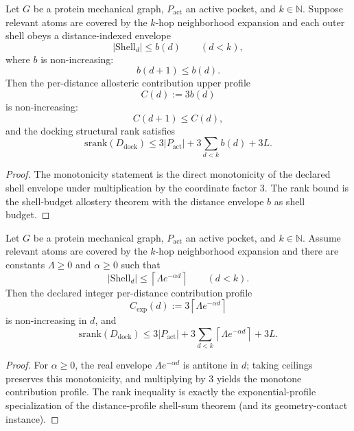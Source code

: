 \begin{theorem}\label{thm:allosteric-distance-decay-law}
Let $G$ be a protein mechanical graph, $P_{\mathrm{act}}$ an active pocket, and $k\in\mathbb{N}$. Suppose relevant atoms are covered by the $k$-hop neighborhood expansion and each outer shell obeys a distance-indexed envelope
\[
\bigl|\mathrm{Shell}_d\bigr|
\le b(d)
\qquad (d<k),
\]
where $b$ is non-increasing:
\[
b(d+1) \le b(d).
\]
Then the per-distance allosteric contribution upper profile
\[
C(d):=3b(d)
\]
is non-increasing:
\[
C(d+1)\le C(d),
\]
and the docking structural rank satisfies
\[
\mathrm{srank}(D_{\mathrm{dock}})
\le
3|P_{\mathrm{act}}| + 3\sum_{d<k} b(d) + 3L.
\]
\end{theorem}

\begin{proof}
The monotonicity statement is the direct monotonicity of the declared shell envelope under multiplication by the coordinate factor $3$. The rank bound is the shell-budget allostery theorem with the distance envelope $b$ as shell budget.
\end{proof}

\begin{theorem}\label{thm:allosteric-exponential-distance-decay}
Let $G$ be a protein mechanical graph, $P_{\mathrm{act}}$ an active pocket, and $k\in\mathbb{N}$. Assume relevant atoms are covered by the $k$-hop neighborhood expansion and there are constants $\Lambda\ge 0$ and $\alpha\ge 0$ such that
\[
\bigl|\mathrm{Shell}_d\bigr|
\le
\left\lceil \Lambda e^{-\alpha d} \right\rceil
\qquad (d<k).
\]
Then the declared integer per-distance contribution profile
\[
C_{\exp}(d):=3\left\lceil \Lambda e^{-\alpha d} \right\rceil
\]
is non-increasing in $d$, and
\[
\mathrm{srank}(D_{\mathrm{dock}})
\le
3|P_{\mathrm{act}}| + 3\sum_{d<k}\left\lceil \Lambda e^{-\alpha d} \right\rceil + 3L.
\]
\end{theorem}

\begin{proof}
For $\alpha\ge 0$, the real envelope $\Lambda e^{-\alpha d}$ is antitone in $d$; taking ceilings preserves this monotonicity, and multiplying by $3$ yields the monotone contribution profile. The rank inequality is exactly the exponential-profile specialization of the distance-profile shell-sum theorem (and its geometry-contact instance).
\end{proof}

